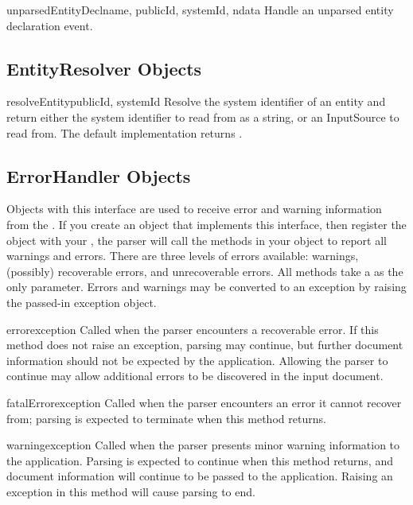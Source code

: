 \begin{methoddesc}[DTDHandler]{unparsedEntityDecl}{name, publicId,
                                                   systemId, ndata}
  Handle an unparsed entity declaration event.
\end{methoddesc}


\subsection{EntityResolver Objects \label{entity-resolver-objects}}

\begin{methoddesc}[EntityResolver]{resolveEntity}{publicId, systemId}
  Resolve the system identifier of an entity and return either the
  system identifier to read from as a string, or an InputSource to
  read from. The default implementation returns .
\end{methoddesc}


\subsection{ErrorHandler Objects \label{sax-error-handler}}

Objects with this interface are used to receive error and warning
information from the .  If you create an object that
implements this interface, then register the object with your
, the parser will call the methods in your object to
report all warnings and errors. There are three levels of errors
available: warnings, (possibly) recoverable errors, and unrecoverable
errors.  All methods take a  as the only
parameter.  Errors and warnings may be converted to an exception by
raising the passed-in exception object.

\begin{methoddesc}[ErrorHandler]{error}{exception}
  Called when the parser encounters a recoverable error.  If this method
  does not raise an exception, parsing may continue, but further document
  information should not be expected by the application.  Allowing the
  parser to continue may allow additional errors to be discovered in the
  input document.
\end{methoddesc}

\begin{methoddesc}[ErrorHandler]{fatalError}{exception}
  Called when the parser encounters an error it cannot recover from;
  parsing is expected to terminate when this method returns.
\end{methoddesc}

\begin{methoddesc}[ErrorHandler]{warning}{exception}
  Called when the parser presents minor warning information to the
  application.  Parsing is expected to continue when this method returns,
  and document information will continue to be passed to the application.
  Raising an exception in this method will cause parsing to end.
\end{methoddesc}
